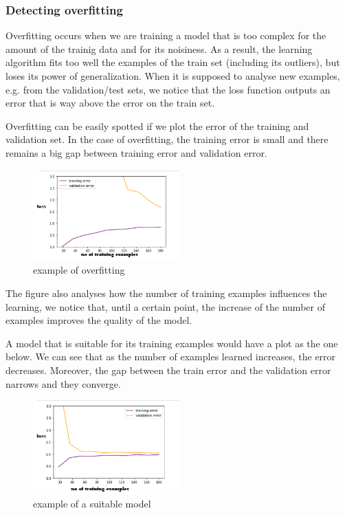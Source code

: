 \documentclass[a4paper,10pt]{article}
\begin{document}
	\subsubsection{Detecting overfitting}
	\quad Overfitting occurs when we are training a model that is too complex for the amount of the trainig data and for its noisiness. As a result, the learning algorithm fits too well the examples of the train set (including its outliers), but loses its power of generalization. When it is supposed to analyse new examples, e.g. from the validation/test sets, we notice that the loss function outputs an error that is way above the error on the train set. 
	
	\quad Overfitting can be easily spotted if we plot the error of the training and validation set. In the case of overfitting, the training error is small and  there remains a big gap between training error and validation error. 
	
	\begin{figure}[!htbp]
		\centering
		\includegraphics[width=0.5\textwidth]{overfit.png}
		\caption{example of overfitting }
	\end{figure}

	\quad The figure also analyses how the number of training examples influences the learning, we notice that, until a certain point, the increase of the number of examples improves the quality of the model.  
	

	\quad A model that is suitable for its training examples would have a plot as the one below. We can see that as the number of examples learned increases, the error decreases. Moreover, the gap between the train error and the validation error narrows and they converge. 
	
		\begin{figure}[!htbp]
		\centering
		\includegraphics[width=0.5\textwidth]{suitable.png}
		\caption{example of a suitable model}
	\end{figure}
 	\vspace{5mm} %
 
\end{document}
